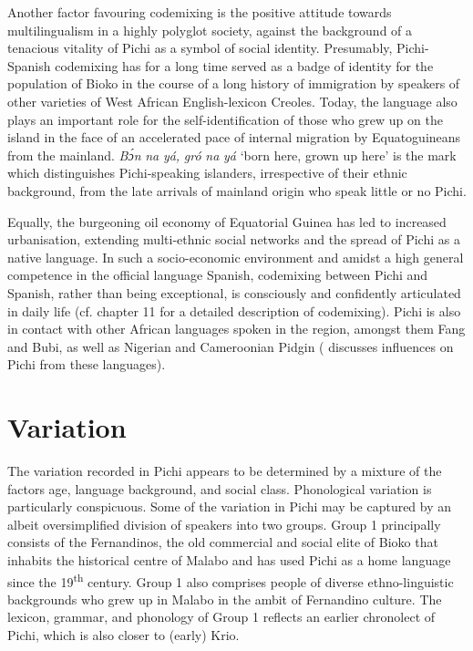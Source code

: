 Another factor favouring codemixing is the positive attitude towards multilingualism in a highly polyglot society, against the background of a tenacious vitality of Pichi as a symbol of social identity. Presumably, Pichi-Spanish codemixing has for a long time served as a badge of identity for the population of Bioko in the course of a long history of immigration by speakers of other varieties of West African English-lexicon Creoles. Today, the language also plays an important role for the self-identification of those who grew up on the island in the face of an accelerated pace of internal migration by Equatoguineans from the mainland. \textit{Bɔ́n} \textit{na} \textit{yá,} \textit{gró} \textit{na} \textit{yá} ‘born here, grown up here’ is the mark which distinguishes Pichi-speaking islanders, irrespective of their ethnic background, from the late arrivals of mainland origin who speak little or no Pichi. 

Equally, the burgeoning oil economy of Equatorial Guinea has led to increased urbanisation, extending multi-ethnic social networks and the spread of Pichi as a native language. In such a socio-economic environment and amidst a high general competence in the official language Spanish, codemixing between Pichi and Spanish, rather than being exceptional, is consciously and confidently articulated in daily life (cf. chapter 11 for a detailed description of codemixing). Pichi is also in contact with other African languages spoken in the region, amongst them Fang and Bubi, as well as Nigerian and Cameroonian Pidgin (\citealt{Yakpo2013} discusses influences on Pichi from these languages).

\section{Variation}\label{sec:1.3}

The variation recorded in Pichi appears to be determined by a mixture of the factors age, language background, and social class. Phonological variation is particularly conspicuous. Some of the variation in Pichi may be captured by an albeit oversimplified division of speakers into two groups. Group 1 principally consists of the Fernandinos, the old commercial and social elite of Bioko \citep{Lynn1984} that inhabits the historical centre of Malabo and has used Pichi as a home language since the 19\textsuperscript{th} century. Group 1 also comprises people of diverse ethno-linguistic backgrounds who grew up in Malabo in the ambit of Fernandino culture. The lexicon, grammar, and phonology of Group 1 reflects an earlier chronolect of Pichi, which is also closer to (early) Krio. 

